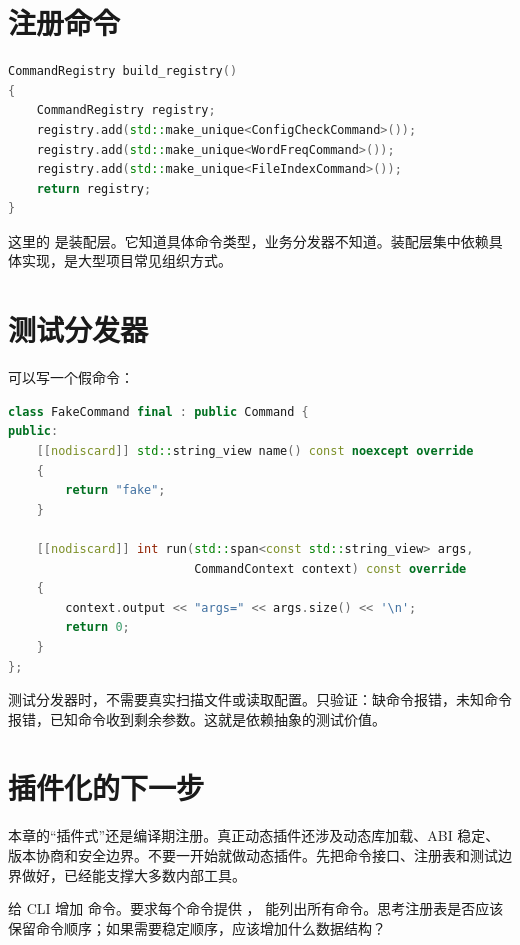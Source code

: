 \section{注册命令}

\begin{lstlisting}[language=C++,caption={组装命令}]
CommandRegistry build_registry()
{
    CommandRegistry registry;
    registry.add(std::make_unique<ConfigCheckCommand>());
    registry.add(std::make_unique<WordFreqCommand>());
    registry.add(std::make_unique<FileIndexCommand>());
    return registry;
}
\end{lstlisting}

这里的  是装配层。它知道具体命令类型，业务分发器不知道。装配层集中依赖具体实现，是大型项目常见组织方式。

\section{测试分发器}

可以写一个假命令：

\begin{lstlisting}[language=C++,caption={测试用假命令}]
class FakeCommand final : public Command {
public:
    [[nodiscard]] std::string_view name() const noexcept override
    {
        return "fake";
    }

    [[nodiscard]] int run(std::span<const std::string_view> args,
                          CommandContext context) const override
    {
        context.output << "args=" << args.size() << '\n';
        return 0;
    }
};
\end{lstlisting}

测试分发器时，不需要真实扫描文件或读取配置。只验证：缺命令报错，未知命令报错，已知命令收到剩余参数。这就是依赖抽象的测试价值。

\section{插件化的下一步}

本章的“插件式”还是编译期注册。真正动态插件还涉及动态库加载、ABI 稳定、版本协商和安全边界。不要一开始就做动态插件。先把命令接口、注册表和测试边界做好，已经能支撑大多数内部工具。

\begin{exercisebox}
给 CLI 增加  命令。要求每个命令提供 ， 能列出所有命令。思考注册表是否应该保留命令顺序；如果需要稳定顺序，应该增加什么数据结构？
\end{exercisebox}


